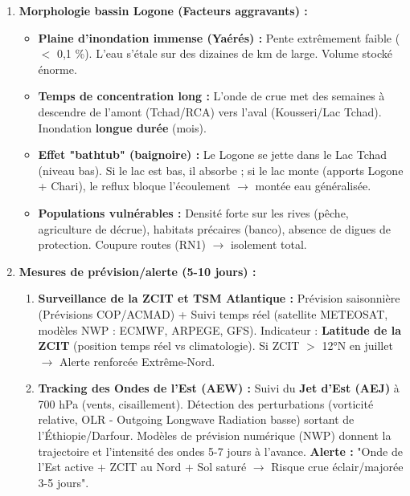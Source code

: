 \documentclass[11pt]{article}
\begin{document}
\begin{exoresolu}
\begin{enumerate}
\begin{itemize}
          \end{itemize}
    \item \textbf{Morphologie bassin Logone (Facteurs aggravants) :}
          \begin{itemize}
              \item \textbf{Plaine d'inondation immense (Yaérés) :} Pente extrêmement faible ($<$ 0,1 \%). L'eau s'étale sur des dizaines de km de large. Volume stocké énorme.
              \item \textbf{Temps de concentration long :} L'onde de crue met des semaines à descendre de l'amont (Tchad/RCA) vers l'aval (Kousseri/Lac Tchad). Inondation \textbf{longue durée} (mois).
              \item \textbf{Effet "bathtub" (baignoire) :} Le Logone se jette dans le Lac Tchad (niveau bas). Si le lac est bas, il absorbe ; si le lac monte (apports Logone + Chari), le reflux bloque l'écoulement $\rightarrow$ montée eau généralisée.
              \item \textbf{Populations vulnérables :} Densité forte sur les rives (pêche, agriculture de décrue), habitats précaires (banco), absence de digues de protection. Coupure routes (RN1) $\rightarrow$ isolement total.
          \end{itemize}
    \item \textbf{Mesures de prévision/alerte (5-10 jours) :}
          \begin{enumerate}
              \item \textbf{Surveillance de la ZCIT et TSM Atlantique :} Prévision saisonnière (Prévisions COP/ACMAD) + Suivi temps réel (satellite METEOSAT, modèles NWP : ECMWF, ARPEGE, GFS). Indicateur : \textbf{Latitude de la ZCIT} (position temps réel vs climatologie). Si ZCIT $>$ 12°N en juillet $\rightarrow$ Alerte renforcée Extrême-Nord.
              \item \textbf{Tracking des Ondes de l'Est (AEW) :} Suivi du \textbf{Jet d'Est (AEJ)} à 700 hPa (vents, cisaillement). Détection des perturbations (vorticité relative, OLR - Outgoing Longwave Radiation basse) sortant de l'Éthiopie/Darfour. Modèles de prévision numérique (NWP) donnent la trajectoire et l'intensité des ondes 5-7 jours à l'avance. \textbf{Alerte :} "Onde de l'Est active + ZCIT au Nord + Sol saturé $\rightarrow$ Risque crue éclair/majorée 3-5 jours".
          \end{enumerate}
\end{enumerate}
\end{exoresolu}
\end{document}
